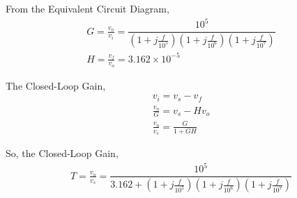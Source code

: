 \begin{enumerate}[label=\thesection.\arabic*.,ref=\thesection.\theenumi]
From the Equivalent Circuit Diagram,
\begin{align}
G = \frac{v_{o}}{v_{i}} = \dfrac{10^5}{\left(1+j\frac{f}{10^{5}}\right)\left(1+j\frac{f}{10^{6}}\right)\left(1+j\frac{f}{10^{7}}\right)}\\
H = \frac{v_{f}}{v_{o}} = 3.162\times 10^{-5}
\end{align}

The Closed-Loop Gain,
\begin{align}
v_{i} = v_{s} - v_{f}\\
\frac{v_{o}}{G} = v_{s} - Hv_{o}\\
\frac{v_{o}}{v_{s}} = \frac{G}{1+GH}
\end{align}

So, the Closed-Loop Gain,
\begin{align}
T = \frac{v_{o}}{v_{s}} = \dfrac{10^5}{3.162 + \left(1+j\frac{f}{10^{5}}\right)\left(1+j\frac{f}{10^{6}}\right)\left(1+j\frac{f}{10^{7}}\right)}
\end{align}
\end{enumerate}
